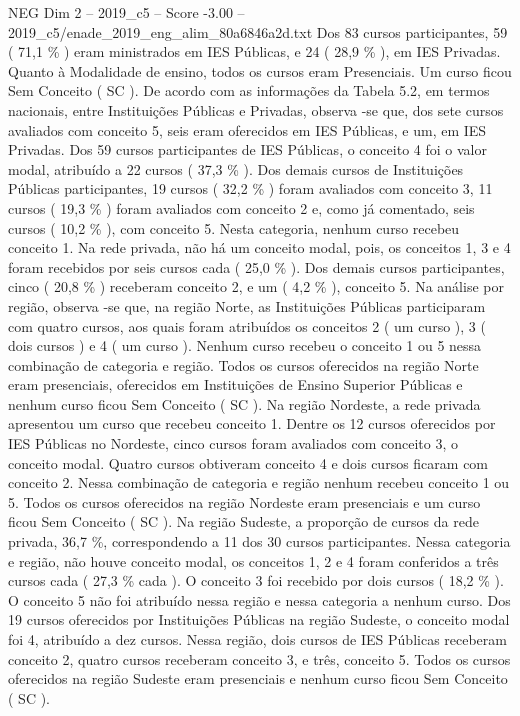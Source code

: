 \begin{textsample}{NEG Dim 2 – 2019\_c5 – Score -3.00 – 2019\_c5/enade\_2019\_eng\_alim\_80a6846a2d.txt}
Dos 83 cursos participantes, 59 ( 71,1 \% ) eram ministrados em IES Públicas, e 24 ( 28,9 \% ), em IES Privadas.
Quanto à Modalidade de ensino, todos os cursos eram Presenciais.
Um curso ficou Sem Conceito ( SC ).
De acordo com as informações da Tabela 5.2, em termos nacionais, entre Instituições Públicas e Privadas, observa -se que, dos sete cursos avaliados com conceito 5, seis eram oferecidos em IES Públicas, e um, em IES Privadas.
Dos 59 cursos participantes de IES Públicas, o conceito 4 foi o valor modal, atribuído a 22 cursos ( 37,3 \% ).
Dos demais cursos de Instituições Públicas participantes, 19 cursos ( 32,2 \% ) foram avaliados com conceito 3, 11 cursos ( 19,3 \% ) foram avaliados com conceito 2 e, como já comentado, seis cursos ( 10,2 \% ), com conceito 5.
Nesta categoria, nenhum curso recebeu conceito 1.
Na rede privada, não há um conceito modal, pois, os conceitos 1, 3 e 4 foram recebidos por seis cursos cada ( 25,0 \% ).
Dos demais cursos participantes, cinco ( 20,8 \% ) receberam conceito 2, e um ( 4,2 \% ), conceito 5.
Na análise por região, observa -se que, na região Norte, as Instituições Públicas participaram com quatro cursos, aos quais foram atribuídos os conceitos 2 ( um curso ), 3 ( dois cursos ) e 4 ( um curso ).
Nenhum curso recebeu o conceito 1 ou 5 nessa combinação de categoria e região.
Todos os cursos oferecidos na região Norte eram presenciais, oferecidos em Instituições de Ensino Superior Públicas e nenhum curso ficou Sem Conceito ( SC ).
Na região Nordeste, a rede privada apresentou um curso que recebeu conceito 1.
Dentre os 12 cursos oferecidos por IES Públicas no Nordeste, cinco cursos foram avaliados com conceito 3, o conceito modal.
Quatro cursos obtiveram conceito 4 e dois cursos ficaram com conceito 2.
Nessa combinação de categoria e região nenhum recebeu conceito 1 ou 5.
Todos os cursos oferecidos na região Nordeste eram presenciais e um curso ficou Sem Conceito ( SC ).
Na região Sudeste, a proporção de cursos da rede privada, 36,7 \%, correspondendo a 11 dos 30 cursos participantes.
Nessa categoria e região, não houve conceito modal, os conceitos 1, 2 e 4 foram conferidos a três cursos cada ( 27,3 \% cada ).
O conceito 3 foi recebido por dois cursos ( 18,2 \% ).
O conceito 5 não foi atribuído nessa região e nessa categoria a nenhum curso.
Dos 19 cursos oferecidos por Instituições Públicas na região Sudeste, o conceito modal foi 4, atribuído a dez cursos.
Nessa região, dois cursos de IES Públicas receberam conceito 2, quatro cursos receberam conceito 3, e três, conceito 5.
Todos os cursos oferecidos na região Sudeste eram presenciais e nenhum curso ficou Sem Conceito ( SC ).

\end{textsample}
